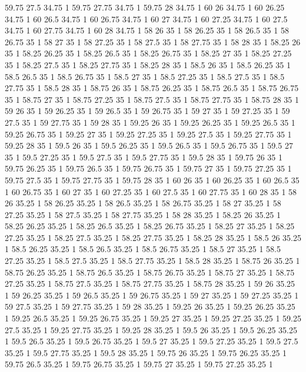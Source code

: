 59.75 27.5 34.75 1
59.75 27.75 34.75 1
59.75 28 34.75 1
60 26 34.75 1
60 26.25 34.75 1
60 26.5 34.75 1
60 26.75 34.75 1
60 27 34.75 1
60 27.25 34.75 1
60 27.5 34.75 1
60 27.75 34.75 1
60 28 34.75 1
58 26 35 1
58 26.25 35 1
58 26.5 35 1
58 26.75 35 1
58 27 35 1
58 27.25 35 1
58 27.5 35 1
58 27.75 35 1
58 28 35 1
58.25 26 35 1
58.25 26.25 35 1
58.25 26.5 35 1
58.25 26.75 35 1
58.25 27 35 1
58.25 27.25 35 1
58.25 27.5 35 1
58.25 27.75 35 1
58.25 28 35 1
58.5 26 35 1
58.5 26.25 35 1
58.5 26.5 35 1
58.5 26.75 35 1
58.5 27 35 1
58.5 27.25 35 1
58.5 27.5 35 1
58.5 27.75 35 1
58.5 28 35 1
58.75 26 35 1
58.75 26.25 35 1
58.75 26.5 35 1
58.75 26.75 35 1
58.75 27 35 1
58.75 27.25 35 1
58.75 27.5 35 1
58.75 27.75 35 1
58.75 28 35 1
59 26 35 1
59 26.25 35 1
59 26.5 35 1
59 26.75 35 1
59 27 35 1
59 27.25 35 1
59 27.5 35 1
59 27.75 35 1
59 28 35 1
59.25 26 35 1
59.25 26.25 35 1
59.25 26.5 35 1
59.25 26.75 35 1
59.25 27 35 1
59.25 27.25 35 1
59.25 27.5 35 1
59.25 27.75 35 1
59.25 28 35 1
59.5 26 35 1
59.5 26.25 35 1
59.5 26.5 35 1
59.5 26.75 35 1
59.5 27 35 1
59.5 27.25 35 1
59.5 27.5 35 1
59.5 27.75 35 1
59.5 28 35 1
59.75 26 35 1
59.75 26.25 35 1
59.75 26.5 35 1
59.75 26.75 35 1
59.75 27 35 1
59.75 27.25 35 1
59.75 27.5 35 1
59.75 27.75 35 1
59.75 28 35 1
60 26 35 1
60 26.25 35 1
60 26.5 35 1
60 26.75 35 1
60 27 35 1
60 27.25 35 1
60 27.5 35 1
60 27.75 35 1
60 28 35 1
58 26 35.25 1
58 26.25 35.25 1
58 26.5 35.25 1
58 26.75 35.25 1
58 27 35.25 1
58 27.25 35.25 1
58 27.5 35.25 1
58 27.75 35.25 1
58 28 35.25 1
58.25 26 35.25 1
58.25 26.25 35.25 1
58.25 26.5 35.25 1
58.25 26.75 35.25 1
58.25 27 35.25 1
58.25 27.25 35.25 1
58.25 27.5 35.25 1
58.25 27.75 35.25 1
58.25 28 35.25 1
58.5 26 35.25 1
58.5 26.25 35.25 1
58.5 26.5 35.25 1
58.5 26.75 35.25 1
58.5 27 35.25 1
58.5 27.25 35.25 1
58.5 27.5 35.25 1
58.5 27.75 35.25 1
58.5 28 35.25 1
58.75 26 35.25 1
58.75 26.25 35.25 1
58.75 26.5 35.25 1
58.75 26.75 35.25 1
58.75 27 35.25 1
58.75 27.25 35.25 1
58.75 27.5 35.25 1
58.75 27.75 35.25 1
58.75 28 35.25 1
59 26 35.25 1
59 26.25 35.25 1
59 26.5 35.25 1
59 26.75 35.25 1
59 27 35.25 1
59 27.25 35.25 1
59 27.5 35.25 1
59 27.75 35.25 1
59 28 35.25 1
59.25 26 35.25 1
59.25 26.25 35.25 1
59.25 26.5 35.25 1
59.25 26.75 35.25 1
59.25 27 35.25 1
59.25 27.25 35.25 1
59.25 27.5 35.25 1
59.25 27.75 35.25 1
59.25 28 35.25 1
59.5 26 35.25 1
59.5 26.25 35.25 1
59.5 26.5 35.25 1
59.5 26.75 35.25 1
59.5 27 35.25 1
59.5 27.25 35.25 1
59.5 27.5 35.25 1
59.5 27.75 35.25 1
59.5 28 35.25 1
59.75 26 35.25 1
59.75 26.25 35.25 1
59.75 26.5 35.25 1
59.75 26.75 35.25 1
59.75 27 35.25 1
59.75 27.25 35.25 1

